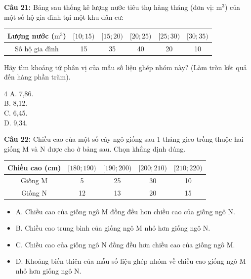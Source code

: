 \documentclass[12pt]{article}
\begin{document}
	\noindent \textbf{Câu 21:} Bảng sau thống kê lượng nước tiêu thụ hàng tháng (đơn vị: $\text{m}^3$) của một số hộ gia đình tại một khu dân cư:
	\begin{center}
		\renewcommand{\arraystretch}{1.3}
		\begin{tabular}{|c|c|c|c|c|c|}
			\hline
			Lượng nước ($\text{m}^3$) & $[10; 15)$ & $[15; 20)$ & $[20; 25)$ & $[25; 30)$ & $[30; 35)$ \\
			\hline
			Số hộ gia đình & 15 & 35 & 40 & 20 & 10 \\
			\hline
		\end{tabular}
	\end{center}
	Hãy tìm khoảng tứ phân vị của mẫu số liệu ghép nhóm này? (Làm tròn kết quả đến hàng phần trăm).
	\begin{multicols}{4}
		A. 7,86. \\
		B. 8,12. \\
		C. 6,45. \\
		D. 9,34.
	\end{multicols}
	
	\noindent \textbf{Câu 22:} Chiều cao của một số cây ngô giống sau 1 tháng gieo trồng thuộc hai giống M và N được cho ở bảng sau. Chọn khẳng định đúng.
	\begin{center}
		\renewcommand{\arraystretch}{1.3}
		\begin{tabular}{|c|c|c|c|c|}
			\hline
			Chiều cao (cm) & $[180; 190)$ & $[190; 200)$ & $[200; 210)$ & $[210; 220)$ \\
			\hline
			Giống M & 5 & 25 & 30 & 10 \\
			\hline
			Giống N & 12 & 13 & 20 & 15 \\
			\hline
		\end{tabular}
	\end{center}
	\begin{itemize}[label=, leftmargin=*]
		\item A. Chiều cao của giống ngô M đồng đều hơn chiều cao của giống ngô N.
		\item B. Chiều cao trung bình của giống ngô M nhỏ hơn giống ngô N.
		\item C. Chiều cao của giống ngô N đồng đều hơn chiều cao của giống ngô M.
		\item D. Khoảng biến thiên của mẫu số liệu ghép nhóm về chiều cao giống ngô M nhỏ hơn giống ngô N.
	\end{itemize}
	
	\vspace{4mm}
	
\end{document}
